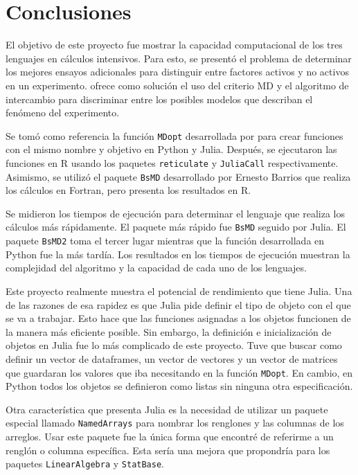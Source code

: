 \section{Conclusiones}

El objetivo de este proyecto fue mostrar la capacidad computacional de los tres lenguajes en cálculos intensivos. Para esto, se presentó el problema de determinar los mejores ensayos adicionales para distinguir entre factores activos y no activos en un experimento. \cite{meyer1996} ofrece como solución el uso del criterio MD y el algoritmo de intercambio para discriminar entre los posibles modelos que describan el fenómeno del experimento. 

Se tomó como referencia la función \texttt{MDopt} desarrollada por \cite{tesis_paty} para crear funciones con el mismo nombre y objetivo en \textsf{Python} y \textsf{Julia}. Después, se ejecutaron las funciones en \textsf{R} usando los paquetes \texttt{reticulate} y \texttt{JuliaCall} respectivamente. Asimismo, se utilizó el paquete \texttt{BsMD} desarrollado por Ernesto Barrios que realiza los cálculos en \textsf{Fortran}, pero presenta los resultados en \textsf{R}. 

Se midieron los tiempos de ejecución para determinar el lenguaje que realiza los cálculos más rápidamente. El paquete más rápido fue \texttt{BsMD} seguido por \textsf{Julia}. El paquete \texttt{BsMD2} toma el tercer lugar mientras que la función desarrollada en \textsf{Python} fue la más tardía. Los resultados en los tiempos de ejecución muestran la complejidad del algoritmo y la capacidad de cada uno de los lenguajes. 

Este proyecto realmente muestra el potencial de rendimiento que tiene \textsf{Julia}. Una de las razones de esa rapidez es que \textsf{Julia} pide definir el tipo de objeto con el que se va a trabajar. Esto hace que las funciones asignadas a los objetos funcionen de la manera más eficiente posible. Sin embargo, la definición e inicialización de objetos en \textsf{Julia} fue lo más complicado de este proyecto. Tuve que buscar como definir un vector de dataframes, un vector de vectores y un vector de matrices que guardaran los valores que iba necesitando en la función \texttt{MDopt}. En cambio, en \textsf{Python} todos los objetos se definieron como listas sin ninguna otra especificación. 

Otra característica que presenta \textsf{Julia} es la necesidad de utilizar un paquete especial llamado \texttt{NamedArrays} para nombrar los renglones y las columnas de los arreglos. Usar este paquete fue la única forma que encontré de referirme a un renglón o columna específica. Esta sería una mejora que propondría para los paquetes \texttt{LinearAlgebra} y \texttt{StatBase}. 
















 


